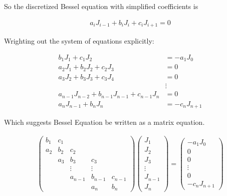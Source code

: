 \documentclass[onecolumn, groupedaddress, 10pt]{revtex4-1}
\begin{document}
So the discretized Bessel equation with simplified coefficients is

\begin{align}
a_i J_{i-1} + b_i J_i + c_i J_{i+1} = 0
\end{align}

Wrighting out the system of equations explicitly:

\begin{align}
b_1 J_1 + c_1 J_2                                 &= - a_1 J_0		\\
a_2 J_1 + b_2 J_2 + c_2 J_3                       &= 0				\\
a_3 J_2 + b_3 J_3 + c_3 J_4                       &= 0				\\
                                                  &\vdots				\\
a_{n-1} J_{n-2} + b_{n-1} J_{n-1} + c_{n-1} J_{n} &=   0				\\
a_n J_{n-1} + b_n J_n                             &= - c_n J_{n+1}
\end{align}

Which suggests Bessel Equation be written as a matrix equation.

\begin{align}
\left( \begin{array}{ccccc}
	b_1 & c_1 &         &         &         \\
	a_2 & b_2 &   c_2   &         &         \\
	    & a_3 &   b_3   &   c_3   &         \\
	    &     & \vdots  & \vdots  &         \\
	    &     & a_{n-1} & b_{n-1} & c_{n-1} \\
	    &     &         &   a_n   &   b_n
\end{array} \right)
\left( \begin{array}{c}
	  J_1   \\
	  J_2   \\
	  J_3   \\
	\vdots  \\
	J_{n-1} \\
	  J_n
\end{array} \right)
=
\left( \begin{array}{c}
	  - a_1 J_0   \\
	      0       \\
	      0       \\
	   \vdots     \\
	      0       \\
	- c_n J_{n+1}
\end{array} \right)
\end{align}
\end{document}
